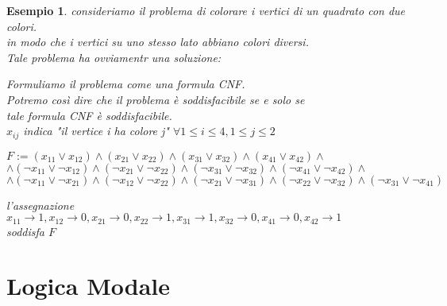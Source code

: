 \documentclass[a4paper,12pt]{article}
\theoremstyle{def}
\theoremstyle{prop}
\theoremstyle{esempio}
\newtheorem*{example}{Esempio}
\theoremstyle{dimostrazione}
\theoremstyle{teo}
\theoremstyle{osservazione}
\begin{document}
\begin{example}
	consideriamo il problema di colorare i vertici di un quadrato con due colori.\\
	in modo che i vertici su uno stesso lato abbiano colori diversi.\\
	Tale problema ha ovviamentr una soluzione:\\
	\begin{center}
	\end{center}
	Formuliamo il problema come una formula CNF.\\
	Potremo così dire che il problema è soddisfacibile se e solo se\\
	tale formula CNF è soddisfacibile.\\
	\(x_{ij}\) indica "il vertice i ha colore j" \(\forall 1 \leq i \leq 4, 1 \leq j \leq 2\)\\
	\begin{center}
		\(F:= (x_{11} \lor x_{12}) \land (x_{21} \lor x_{22}) \land (x_{31} \lor x_{32}) \land (x_{41} \lor x_{42}) \land\)\\
		\(\land (\neg x_{11} \lor \neg x_{12}) \land ( \neg x_{21} \lor \neg x_{22}) \land ( \neg x_{31} \lor \neg x_{32}) \land ( \neg x_{41} \lor \neg x_{42}) \land\)\\
		\(\land (\neg x_{11} \lor \neg x_{21}) \land ( \neg x_{12} \lor \neg x_{22}) \land ( \neg x_{21} \lor \neg x_{31}) \land ( \neg x_{22} \lor \neg x_{32}) \land (\neg x_{31} \lor \neg x_{41}) \)
	\end{center}
	l'assegnazione \(x_{11} \rightarrow 1, x_{12} \rightarrow 0, x_{21} \rightarrow 0, x_{22} \rightarrow 1, x_{31} \rightarrow 1, x_{32} \rightarrow 0, x_{41} \rightarrow 0, x_{42} \rightarrow 1\)\\
	soddisfa \(F\)
\end{example}
\newpage
\section{Logica Modale}
\end{document}
